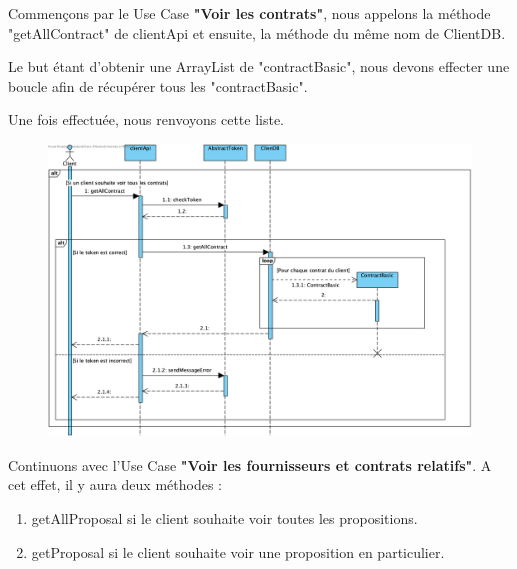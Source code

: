 \begin{flushleft}
Commençons par le Use Case \textbf{"Voir les contrats"}, nous appelons la méthode "getAllContract" de clientApi et ensuite, la méthode du même nom de ClientDB.
\end{flushleft}

\begin{flushleft}
Le but étant d'obtenir une ArrayList de "contractBasic", nous devons effecter une boucle afin de récupérer tous les "contractBasic".
\end{flushleft}

\begin{flushleft}
Une fois effectuée, nous renvoyons cette liste.
\end{flushleft}

\begin{figure}[h]
\centering
\includegraphics[height = 0.8\textwidth]{sequence/client/seqContrats.png}
\end{figure}

\newpage

\begin{flushleft}
Continuons avec l'Use Case \textbf{"Voir les fournisseurs et
contrats relatifs"}.
A cet effet, il y aura deux méthodes :
\end{flushleft}

\begin{enumerate}
\item getAllProposal si le client souhaite voir toutes les propositions.
\item getProposal si le client souhaite voir une proposition en particulier.
\end{enumerate}

